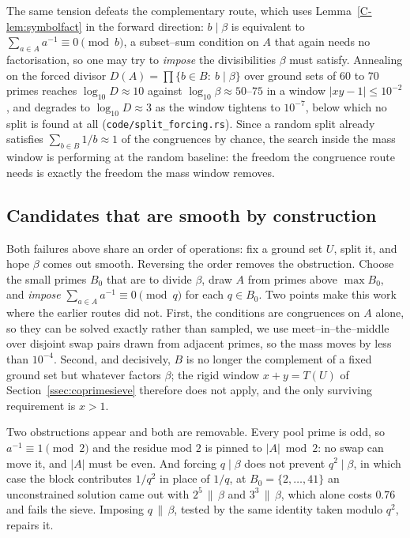 \documentclass[11pt]{article}
\theoremstyle{definition}
\begin{document}
The same tension defeats the complementary route, which uses Lemma~\ref{C-lem:symbolfact} in the
forward direction: $b\mid\beta$ is equivalent to $\sum_{a\in A}a^{-1}\equiv0\pmod b$, a subset--sum
condition on $A$ that again needs no factorisation, so one may try to \emph{impose} the divisibilities
$\beta$ must satisfy. Annealing on the forced divisor $D(A)=\prod\{b\in B:\ b\mid\beta\}$ over ground
sets of $60$ to $70$ primes reaches $\log_{10}D\approx10$ against $\log_{10}\beta\approx50$--$75$ in a
window $|xy-1|\le10^{-2}$, and degrades to $\log_{10}D\approx3$ as the window tightens to $10^{-7}$,
below which no split is found at all \textup{(\texttt{code/split\_forcing.rs})}. Since a random split
already satisfies $\sum_{b\in B}1/b\approx1$ of the congruences by chance, the search inside the mass
window is performing at the random baseline: the freedom the congruence route needs is exactly the
freedom the mass window removes.

\subsection{Candidates that are smooth by construction}\label{ssec:smoothbuilt}

Both failures above share an order of operations: fix a ground set $U$, split it, and hope $\beta$
comes out smooth. Reversing the order removes the obstruction. Choose the small primes $B_0$ that
are to divide $\beta$, draw $A$ from primes above $\max B_0$, and \emph{impose}
$\sum_{a\in A}a^{-1}\equiv0\pmod q$ for each $q\in B_0$. Two points make this work where the earlier
routes did not. First, the conditions are congruences on $A$ alone, so they can be solved exactly
rather than sampled, we use meet--in--the--middle over disjoint swap pairs drawn from adjacent
primes, so the mass moves by less than $10^{-4}$. Second, and decisively, $B$ is no longer the
complement of a fixed ground set but whatever factors $\beta$; the rigid window $x+y=T(U)$ of
Section~\ref{ssec:coprimesieve} therefore does not apply, and the only surviving requirement is
$x>1$.

Two obstructions appear and both are removable. Every pool prime is odd, so $a^{-1}\equiv1\pmod2$ and
the residue mod $2$ is pinned to $|A|\bmod2$: no swap can move it, and $|A|$ must be even. And
forcing $q\mid\beta$ does not prevent $q^2\mid\beta$, in which case the block contributes $1/q^2$ in
place of $1/q$, at $B_0=\{2,\dots,41\}$ an unconstrained solution came out with $2^5\,\|\,\beta$ and
$3^3\,\|\,\beta$, which alone costs $0.76$ and fails the sieve. Imposing $q\,\|\,\beta$, tested by the
same identity taken modulo $q^2$, repairs it.
\end{document}
